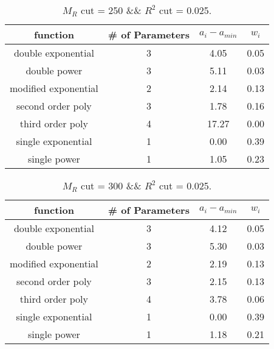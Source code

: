  
\begin{table}[H] 
\begin{center} 
\begin{tabular}{|c|c|c|c|} 
\hline function & \# of Parameters & $a_i-a_{min}$ & $w_i$ \\ \hline 
double exponential &  3 &   4.05 &   0.05 \\ 
double power &  3 &   5.11 &   0.03 \\ 
modified exponential &  2 &   2.14 &   0.13 \\ 
second order poly &  3 &   1.78 &   0.16 \\ 
third order poly &  4 &  17.27 &   0.00 \\ 
single exponential &  1 &   0.00 &   0.39 \\ 
single power &  1 &   1.05 &   0.23 \\ 
\hline 
\end{tabular} 
\caption{$M_R$ cut = 250 \&\& $R^2$ cut = 0.025.} 
\label{tab:FitChoices_250_0.025} 
\end{center} 
\end{table} 
 
 
\begin{table}[H] 
\begin{center} 
\begin{tabular}{|c|c|c|c|} 
\hline function & \# of Parameters & $a_i-a_{min}$ & $w_i$ \\ \hline 
double exponential &  3 &   4.12 &   0.05 \\ 
double power &  3 &   5.30 &   0.03 \\ 
modified exponential &  2 &   2.19 &   0.13 \\ 
second order poly &  3 &   2.15 &   0.13 \\ 
third order poly &  4 &   3.78 &   0.06 \\ 
single exponential &  1 &   0.00 &   0.39 \\ 
single power &  1 &   1.18 &   0.21 \\ 
\hline 
\end{tabular} 
\caption{$M_R$ cut = 300 \&\& $R^2$ cut = 0.025.} 
\label{tab:FitChoices_300_0.025} 
\end{center} 
\end{table} 
 
